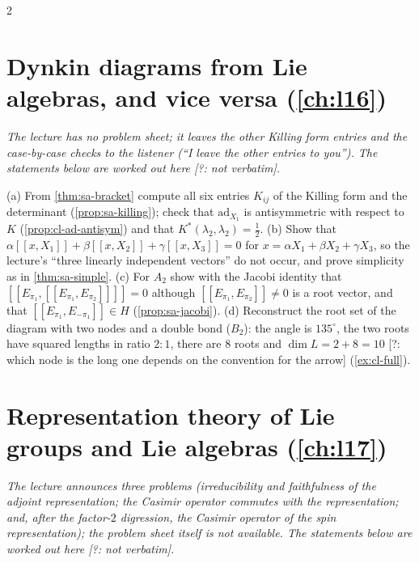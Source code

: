 \begin{paracol}{2}
\section{Dynkin diagrams from Lie algebras, and vice versa (\cref{ch:l16})}\label{exam:ch16}

\emph{The lecture has no problem sheet; it leaves the other Killing form entries and the case-by-case checks to the listener (``I leave the other entries to you''). The statements below are worked out here [?: not verbatim].}

\begin{exercise}\label{ex:sa-full}
(a) From \cref{thm:sa-bracket} compute all six entries $K_{ij}$ of the Killing form and the determinant (\cref{prop:sa-killing}); check that $\mathrm{ad}_{X_1}$ is antisymmetric with respect to $K$ (\cref{prop:cl-ad-antisym}) and that $K^*(\lambda_2,\lambda_2)=\tfrac12$. (b) Show that $\alpha[\![x,X_1]\!]+\beta[\![x,X_2]\!]+\gamma[\![x,X_3]\!]=0$ for $x=\alpha X_1+\beta X_2+\gamma X_3$, so the lecture's ``three linearly independent vectors'' do not occur, and prove simplicity as in \cref{thm:sa-simple}. (c) For $A_2$ show with the Jacobi identity that $[\![E_{\pi_1},[\![E_{\pi_1},E_{\pi_2}]\!]]\!]=0$ although $[\![E_{\pi_1},E_{\pi_2}]\!]\ne0$ is a root vector, and that $[\![E_{\pi_1},E_{-\pi_1}]\!]\in H$ (\cref{prop:sa-jacobi}). (d) Reconstruct the root set of the diagram with two nodes and a double bond ($B_2$): the angle is $135^\circ$, the two roots have squared lengths in ratio $2:1$, there are $8$ roots and $\dim L=2+8=10$ [?: which node is the long one depends on the convention for the arrow] (\cref{ex:cl-full}).
\end{exercise}

\section{Representation theory of Lie groups and Lie algebras (\cref{ch:l17})}\label{exam:ch17}

\emph{The lecture announces three problems (irreducibility and faithfulness of the adjoint representation; the Casimir operator commutes with the representation; and, after the factor-$2$ digression, the Casimir operator of the spin representation); the problem sheet itself is not available. The statements below are worked out here [?: not verbatim].}


\end{paracol}

